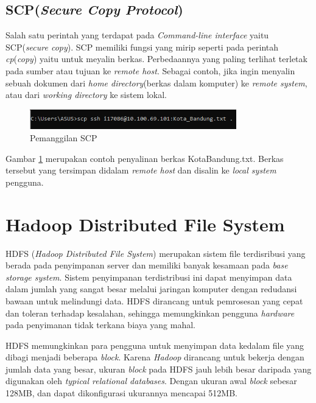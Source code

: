 \subsection{SCP(\textit{Secure Copy Protocol})}
Salah satu perintah yang terdapat pada \textit{Command-line interface} yaitu SCP(\textit{secure copy}). SCP memiliki fungsi yang mirip seperti pada perintah \emph{cp}(\textit{copy}) yaitu untuk meyalin berkas. Perbedaannya yang paling terlihat terletak pada sumber atau tujuan ke \textit{remote host}. Sebagai contoh, jika ingin menyalin sebuah dokumen dari \textit{home directory}(berkas dalam komputer) ke \textit{remote system}, atau dari \textit{working directory} ke sistem lokal. 

\begin{figure}[H]
	\centering
	\includegraphics[width=0.8\textwidth]{Gambar/scp.png}
	\caption{Pemanggilan SCP}
	\label{fig:scp}
\end{figure}

Gambar \ref{fig:scp} merupakan contoh penyalinan berkas Kota\textunderscore Bandung.txt. Berkas tersebut yang tersimpan didalam \textit{remote host} dan disalin ke \textit{local system} pengguna.


\section{Hadoop Distributed File System}
\label{sec:hdfs}
HDFS (\textit{Hadoop Distributed File System}) merupakan sistem file terdisribusi yang berada pada penyimpanan server dan memiliki banyak kesamaan pada \textit{base storage system}. Sistem penyimpanan terdistribusi ini dapat menyimpan data dalam jumlah yang sangat besar melalui jaringan komputer dengan redudansi bawaan untuk melindungi data. HDFS dirancang untuk pemrosesan yang cepat dan toleran terhadap kesalahan, sehingga memungkinkan pengguna \textit{hardware} pada penyimanan tidak terkana biaya yang mahal.

HDFS memungkinkan para pengguna untuk menyimpan data kedalam file yang dibagi menjadi beberapa \textit{block}. Karena \textit{Hadoop} dirancang untuk bekerja dengan jumlah data yang besar, ukuran \textit{block} pada HDFS jauh lebih besar daripada yang digunakan oleh \textit{typical relational databases}. Dengan ukuran awal \textit{block} sebesar 128MB, dan dapat dikonfigurasi ukurannya mencapai 512MB.

